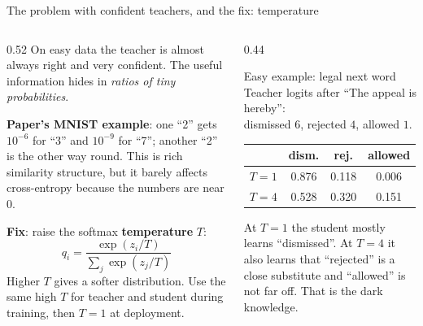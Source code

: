 \documentclass[aspectratio=169,11pt]{beamer}
\begin{document}
\begin{frame}{The problem with confident teachers, and the fix: temperature}
  \begin{columns}[T]
    \begin{column}{0.52\textwidth}
      \small
      On easy data the teacher is almost always right and very confident. The useful information hides in \emph{ratios of tiny probabilities}.
      \vspace{1mm}

      \textbf{Paper's MNIST example}: one ``2'' gets $10^{-6}$ for ``3'' and $10^{-9}$ for ``7''; another ``2'' is the other way round. This is rich similarity structure, but it barely affects cross-entropy because the numbers are near 0.
      \vspace{1mm}

      \textbf{Fix}: raise the softmax \textbf{temperature} $T$:
      \[
        q_i=\frac{\exp(z_i/T)}{\sum_j\exp(z_j/T)}
      \]
      Higher $T$ gives a softer distribution. Use the same high $T$ for teacher and student during training, then $T=1$ at deployment.
    \end{column}
    \begin{column}{0.44\textwidth}
      \begin{exampleblock}{Easy example: legal next word}
        \small
        Teacher logits after ``The appeal is hereby'':\\
        dismissed $6$, rejected $4$, allowed $1$.
        \vspace{1mm}

        \begin{tabular}{@{}lccc@{}}
          & dism. & rej. & allowed\\
          \midrule
          $T=1$ & 0.876 & 0.118 & 0.006\\
          $T=4$ & 0.528 & 0.320 & 0.151\\
        \end{tabular}
        \vspace{1mm}

        At $T=1$ the student mostly learns ``dismissed''. At $T=4$ it also learns that ``rejected'' is a close substitute and ``allowed'' is not far off. That is the dark knowledge.
      \end{exampleblock}
    \end{column}
  \end{columns}
\end{frame}
\end{document}
